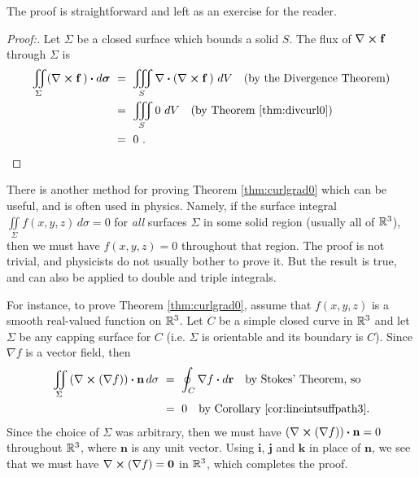 The proof is straightforward and left as an exercise for the reader.

\begin{proofbar}\begin{proof}[Proof:]
 Let $\Sigma$ be a closed surface which bounds a solid $S$. The flux of $\nabla \bm{\times} \mathbf{f}$
 through $\Sigma$ is
 \begin{align*}
  \iint\limits_{\Sigma} \Dotprod{(\Crossprod{\nabla}{\mathbf{f}}\,)}{d\bm{\sigma}} ~&=~
   \iiint\limits_{S} \Dotprod{\nabla}{(\Crossprod{\nabla}{\mathbf{f}}\,)} ~dV\quad\text{(by the Divergence Theorem)}\\
   &=~ \iiint\limits_{S} 0 ~dV \quad\text{(by Theorem \ref{thm:divcurl0})}\\
   &=~ 0 ~.\hfill\qedhere
 \end{align*}
\end{proof}\end{proofbar}

There is another method for proving Theorem \ref{thm:curlgrad0} which can be useful, and is often used in physics.
Namely, if the surface integral $\iint\limits_{\Sigma} f(x,y,z)\,d\sigma = 0$
for \emph{all} surfaces $\Sigma$ in some solid region (usually all of $\mathbb{R}^{3}$), then we must have $f(x,y,z) = 0$
throughout that region. The proof is not trivial, and physicists do not usually bother to prove it. But the result is
true, and can also be applied to double and triple integrals.

For instance, to prove Theorem \ref{thm:curlgrad0}, assume that $f(x,y,z)$ is a smooth real-valued function on
$\mathbb{R}^{3}$. Let $C$ be a simple closed curve in $\mathbb{R}^{3}$ and let $\Sigma$ be any capping surface for $C$ (i.e.
$\Sigma$ is orientable and its boundary is $C$). Since $\nabla f$ is a vector field, then
\begin{align*}
 \iint\limits_{\Sigma} \left( \nabla \bm{\times} (\nabla f) \right)  \bm{\cdot} \mathbf{n}\,d\sigma ~&=~
  \oint_{C}\nabla f \bm{\cdot} d\mathbf{r} \quad\text{by Stokes' Theorem, so}\\
 &=~ 0 \quad\text{by Corollary \ref{cor:lineintsuffpath3}.}
\end{align*}
Since the choice of $\Sigma$ was arbitrary, then we must have $(\nabla \bm{\times} (\nabla f)) \bm{\cdot} \mathbf{n}
= 0$ throughout $\mathbb{R}^{3}$, where $\mathbf{n}$ is any unit vector. 
Using $\mathbf{i}$, $\mathbf{j}$ and $\mathbf{k}$ in place of $\mathbf{n}$, we see that we must have $\nabla \bm{\times} (\nabla f) = \mathbf{0}$ in $\mathbb{R}^{3}$, which completes the
proof.

